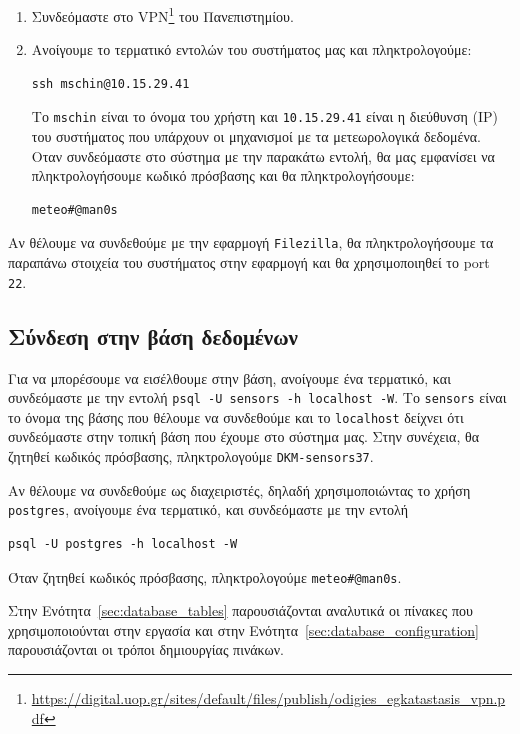 \documentclass[a4paper,12pt]{article}
\begin{document}
\begin{enumerate}
\item 
Συνδεόμαστε στο VPN\footnote{\url{https://digital.uop.gr/sites/default/files/publish/odigies_egkatastasis_vpn.pdf}} του Πανεπιστημίου. 

\item 
Ανοίγουμε το τερματικό εντολών του συστήματος μας και πληκτρολογούμε: 

\begin{lstlisting}
ssh mschin@10.15.29.41
\end{lstlisting}
        
Το \texttt{mschin} είναι το όνομα του χρήστη και \texttt{10.15.29.41} είναι η διεύθυνση (IP) του συστήματος που υπάρχουν οι μηχανισμοί με τα μετεωρολογικά δεδομένα. Οταν συνδεόμαστε στο σύστημα με την παρακάτω εντολή, θα μας εμφανίσει να πληκτρολογήσουμε κωδικό πρόσβασης και θα πληκτρολογήσουμε:

\begin{lstlisting}
meteo#@man0s
\end{lstlisting}

\end{enumerate}

Αν θέλουμε να συνδεθούμε με την εφαρμογή \texttt{Filezilla}, θα πληκτρολογήσουμε τα παραπάνω στοιχεία του συστήματος στην εφαρμογή και θα χρησιμοποιηθεί το port \texttt{22}.

\subsection{Σύνδεση στην βάση δεδομένων}\label{sec:how_to_connect_to_the_database}
Για να μπορέσουμε να εισέλθουμε στην βάση, ανοίγουμε ένα τερματικό, και συνδεόμαστε με την εντολή \texttt{psql -U sensors -h localhost -W}. Το \texttt{sensors} είναι το όνομα της βάσης που θέλουμε να συνδεθούμε και το \texttt{localhost} δείχνει ότι συνδεόμαστε στην τοπική βάση που έχουμε στο σύστημα μας. Στην συνέχεια, θα ζητηθεί κωδικός πρόσβασης, πληκτρολογούμε \texttt{DKM-sensors37}.

Αν θέλουμε να συνδεθούμε ως διαχειριστές, δηλαδή χρησιμοποιώντας το χρήση \texttt{postgres}, ανοίγουμε ένα τερματικό, και συνδεόμαστε με την εντολή 
\begin{lstlisting}
psql -U postgres -h localhost -W 
\end{lstlisting}
Όταν ζητηθεί κωδικός πρόσβασης, πληκτρολογούμε \texttt{meteo\#@man0s}.

Στην Ενότητα~\ref{sec:database_tables} παρουσιάζονται αναλυτικά οι πίνακες που χρησιμοποιούνται στην εργασία και στην Ενότητα~\ref{sec:database_configuration} παρουσιάζονται οι τρόποι δημιουργίας πινάκων.
\end{document}
